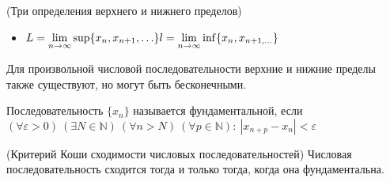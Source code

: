 \begin{multicols}{2}
\begin{theorema}{(Три определения верхнего и нижнего пределов)}{}
\begin{itemize}
		\item $L = \lim\limits_{n\to\infty} \sup\{x_n, x_{n+1}, \ldots\}\\l = \lim\limits_{n\to\infty} \inf\{x_n, x_{n+1, \ldots}\}$
\end{itemize}
\end{theorema}
\begin{note}{}{}
    Для произвольной числовой последовательности верхние и нижние пределы также существуют, но могут быть бесконечными.
\end{note}
\begin{definition}{}{}
    Последовательность $\{x_n\}$ называется фундаментальной, если \mbox{$(\forall \varepsilon > 0)\ (\exists N \in \mathbb N)\ (\forall n > N)\ (\forall p \in \mathbb N):\ |x_{n+p} - x_n| < \varepsilon$}
\end{definition}
\begin{theorema}{(Критерий Коши сходимости числовых последовательностей)}{}
    Числовая последовательность сходится тогда и только тогда, когда она фундаментальна.
\end{theorema}

\end{multicols}
